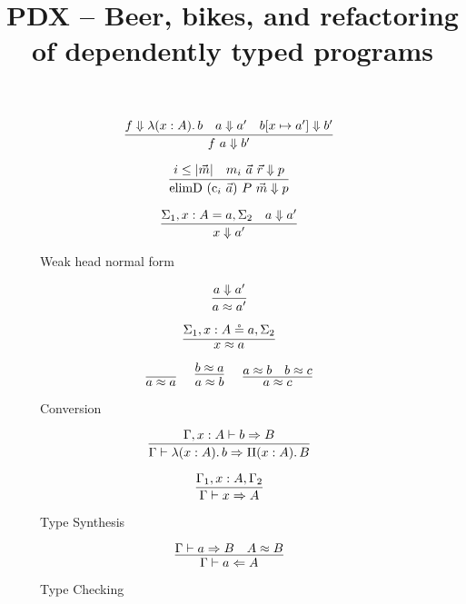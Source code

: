 \documentclass{article}
\title{PDX -- Beer, bikes, and refactoring of dependently typed programs}
\begin{document}
\maketitle

\begin{figure}[h]
\caption{Weak head normal form}

$$
\infer
  []
  {\whnf{\app{f}{a}}{b'}}
{
  \whnf{f}{\lam{x}{A}{b}}
  &
  \whnf{a}{a'}
  &
  \whnf{\sub{b}{x}{a'}}{b'}
}
$$

$$
\infer
  []
  {\whnf{\con{elimD}~(\con{c}_i~\vec{a})~P~\vec{m}}{p}}
{
  i \leq |\vec{m}|
  &
  \whnf{m_i~\vec{a}~\vec{r}}{p}
}
$$


$$
\infer
  []
  {\whnf{x}{a'}}
{
  \Sigma_1, \sigd{x}{A}{a}, \Sigma_2
  &
  \whnf{a}{a'}
}
$$

\end{figure}

\begin{figure}[h]
\caption{Conversion}

$$
\infer
  []
  {\conv{a}{a'}}
{
  \whnf{a}{a'}
}
$$

$$
\infer
  []
  {\conv{x}{a}}
{
  \Sigma_1, \sigr{x}{A}{a}, \Sigma_2
}
$$

$$
\infer
  []
  {\conv{a}{a}}
{
}
\quad
\infer
  []
  {\conv{a}{b}}
{
  \conv{b}{a}
}
\quad
\infer
  []
  {\conv{a}{c}}
{
  \conv{a}{b}
  &
  \conv{b}{c}
}
$$


\end{figure}

\begin{figure}[h]
\caption{Type Synthesis}

$$
\infer
  []
  {\synthG{\lam{x}{A}{b}}{\pie{x}{A}{B}}}
{
  \synth{\Gamma, x : A}{b}{B}
}
$$

$$
\infer
  []
  {\synthG{x}{A}}
{
  \Gamma_1, x : A, \Gamma_2
}
$$

\end{figure}

\begin{figure}[h]
\caption{Type Checking}

$$
\infer
  []
  {\chek{\Gamma}{a}{A}}
{
  \synthG{a}{B}
  &
  \conv{A}{B}
}
$$

\end{figure}
\end{document}
